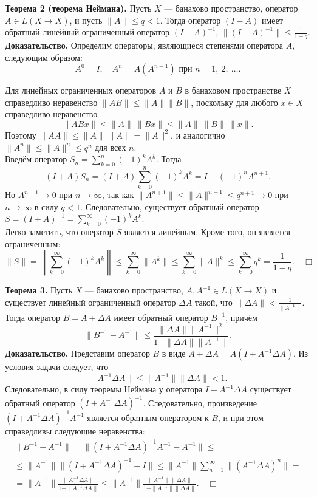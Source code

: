 \documentclass[12pt,a4paper, titlepage]{article}
\begin{document}
\textbf{Теорема 2 (теорема Неймана).} Пусть $X$ --- банахово пространство, оператор $A \in L (X \to X)$, и пусть $\|A\| \leqslant q < 1$. Тогда оператор $(I - A)$ имеет обратный линейный ограниченный оператор $(I - A)^{-1}$, $\|(I - A)^{-1}\| \leqslant \frac 1 {1-q}$.\\
\textbf{Доказательство.} Определим операторы, являющиеся степенями оператора $A$, следующим образом:
$$
A^0 = I, \quad A^n = A(A^{n-1}) \text{ при } n = 1, \ 2, \ \dots.
$$

Для линейных ограниченных операторов $A$ и $B$ в банаховом пространстве $X$ справедливо неравенство $\|AB\| \leqslant \|A\|\|B\|$, поскольку для любого $x \in X$ справедливо неравенство
$$
\|ABx\| \leqslant \|A\| \ \|Bx\| \leqslant \|A\| \ \|B\| \ \|x\|. 
$$
Поэтому $\|AA\| \leqslant \|A\| \ \|A\| = \|A\|^2$, и аналогично $\|A^n\| \leqslant \|A\|^n \leqslant q^n$ для всех $n$.\\

Введём оператор $S_n = \sum\limits_{k=0}^n (-1)^k A^k$. Тогда
$$
(I + A)S_n = (I + A) \sum_{k=0}^n (-1)^k A^k  = I + (-1) ^ n A^{n+1}.
$$
Но $A^{n+1} \to 0$ при $n\to\infty$, так как $\|A^{n+1}\| \leqslant \|A\|^{n+1} \leqslant q^{n+1} \to 0$ при $n\to\infty$ в силу $q < 1$. Следовательно, существует обратный оператор $S = (I + A)^{-1} = \sum\limits_{k=0}^\infty (-1)^k A^k$.\\

Легко  заметить, что оператор $S$ является линейным. Кроме того, он является ограниченным:
$$
\|S\| = \left\| \sum_{k=0}^\infty (-1)^k A^k \right\| \leqslant \sum_{k=0}^\infty \|A^k\| \leqslant \sum_{k=0}^\infty \|A\|^k \leqslant \sum_{k=0}^\infty q^k = \frac 1 {1 - q}. \quad \Box
$$

\textbf{Теорема 3.} Пусть $X$ --- банахово пространство, $A, A^{-1} \in L(X\to X)$ и существует линейный ограниченный оператор $\Delta A$ такой, что $ \|\Delta A\| < \frac 1 {\|A^{-1}\|}$. Тогда оператор $B = A + \Delta A$ имеет обратный оператор $B^{-1}$, причём 
$$
\|B^{-1} - A^{-1}\| \leqslant \frac {\|\Delta A\| \|A^{-1}\|^2} {1 - \|\Delta A\| \|A^{-1}\|}.
$$
\textbf{Доказательство.} Представим оператор $B$ в виде $A + \Delta A = A(I + A^{-1} \Delta A)$. Из условия задачи следует, что
$$
\|A^{-1} \Delta A\| \leqslant \|A^{-1}\| \|\Delta A\| < 1.
$$
Следовательно, в силу теоремы Неймана у оператора $I + A^{-1} \Delta A$ существует обратный оператор $(I + A^{-1} \Delta A)^{-1}$. Следовательно, произведение $(I + A^{-1} \Delta A)^{-1} A^{-1}$ является обратным оператором к $B$, и при этом справедливы следующие неравенства:
\begin{multline*}
\|B^{-1} - A^{-1}\|  = \|(I + A^{-1} \Delta A)^{-1} A^{-1} - A^{-1}\| \leqslant \\
\leqslant \|A^{-1}\| \|(I + A^{-1} \Delta A)^{-1} - I\| \leqslant
\|A^{-1}\| \sum_{n=1}^\infty \|(A^{-1} \Delta A)^n \| = \\
= \|A^{-1}\| \frac{\|A^{-1}\Delta A\|} {1 - \|A^{-1}\Delta A\| } \leqslant
\|A^{-1}\| \frac{\|A^{-1}\|\|\Delta A\|} {1 - \|A^{-1}\| \|\Delta A\| }. \quad \Box
\end{multline*}
\end{document}
